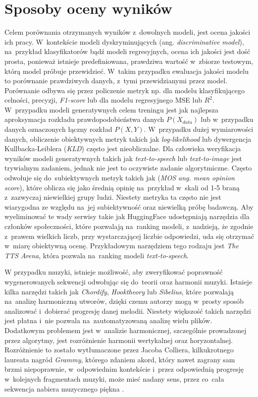 \documentclass[data-science]{agh-wi} %
\begin{document}
\section{Sposoby oceny wyników}
Celem porównania otrzymanych wyników z~dowolnych modeli, jest ocena jakości ich pracy. W~kontekście modeli dyskryminujących (ang. \textit{discriminative model}), na~przykład klasyfikatorów bądź modeli regresyjnych, ocena ich jakości jest dość prosta, ponieważ istnieje predefiniowana, prawdziwa wartość w~zbiorze testowym, którą model próbuje przewidzieć. W~takim przypadku ewaluacja jakości modelu to porównanie prawdziwych danych, z~tymi przewidzianymi przez model. Porównanie odbywa się przez policzenie metryk np. dla modelu klasyfikującego celności, precyzji, \textit{F1-score} lub dla modelu regresyjnego MSE lub $R^2$. W~przypadku modeli generatywnych celem treningu jest jak najlepsza aproksymacja rozkładu prawdopodobieństwa danych $P(X_{data})$ lub w~przypadku danych oznaczonych łączny rozkład $P(X, Y)$. W~przypadku dużej wymiarowości danych, obliczenie obiektywnych metryk takich jak \textit{log-likelihood} lub dywergencja Kullbacka-Leiblera (\textit{KLD}) często jest nieobliczalne. Dla człowieka weryfikacja wyników modeli generatywnych takich jak \textit{text-to-speech} lub \textit{text-to-image} jest trywialnym zadaniem, jednak nie jest to oczywiste zadanie algorytmiczne. Często odwołuje się do~subiektywnych metryk takich jak (\textit{MOS ang. mean opinion score}), które oblicza się jako średnią opinię na~przykład w~skali od 1-5 braną z~zazwyczaj niewielkiej grupy ludzi. Niestety metryka ta często nie jest wiarygodna ze względu na~jej subiektywność oraz niewielką próbę badawczą. Aby wyeliminować te wady serwisy takie jak HuggingFace udostępniają narzędzia dla członków społeczności, które pozwalają na~ranking modeli, z~nadzieją, że zgodnie z~prawem wielkich liczb, przy wystarczającej liczbie odpowiedzi, uda się otrzymać w~miarę obiektywną ocenę. Przykładowym narzędziem tego rodzaju jest \textit{The TTS Arena}\cite{tts_arena}, która pozwala na~ranking modeli \textit{text-to-speech}.

W przypadku muzyki, istnieje możliwość, aby zweryfikować poprawność wygenerowanych sekwencji odwołując się do~teorii oraz harmonii muzyki. Istnieje kilka narzędzi takich jak \textit{Chordify}, \textit{Hooktheory} lub \textit{Sibelius}, które pozwalają na~analizę harmoniczną utworów, dzięki czemu autorzy mogą w~prosty sposób analizować i~dobierać progresję danej melodii. Niestety większość takich narzędzi jest płatna i~nie pozwala na~zautomatyzowaną analizę wielu plików. Dodatkowym problemem jest w~analizie harmonicznej, szczególnie prowadzonej przez algorytmy, jest rozróżnienie harmonii wertykalnej oraz horyzontalnej. Rozróżnienie to zostało wytłumaczone przez Jacoba Colliera, kilkukrotnego laureata nagród \textit{Grammy}, którego zdaniem akord, który nawet zagrany sam brzmi niepoprawnie, w~odpowiednim kontekście i~przez odpowiednią progresję w~kolejnych fragmentach muzyki, może mieć nadany sens, przez co~cała sekwencja nabiera muzycznego piękna \cite{collier_wrongnote}.
\end{document}
